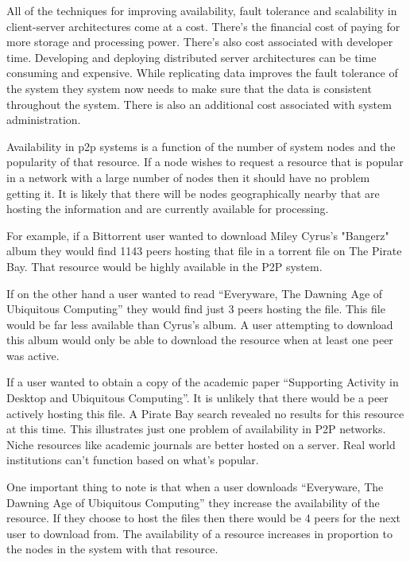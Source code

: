 \documentclass[11pt]{amsart}
\begin{document}
\indent All of the techniques for improving availability, fault tolerance and scalability in client-server architectures come at a cost. There's the financial cost of paying for more storage and processing power. There's also cost associated with developer time. Developing and deploying distributed server architectures can be time consuming and expensive. While replicating data improves the fault tolerance of the system they system now needs to make sure that the data is consistent throughout the system. There is also an additional cost associated with system administration.\cite{DistSys}


\indent
Availability in p2p systems is a function of the number of system nodes and the popularity of that resource. If a node wishes to request a resource that is popular in a network with a large number of nodes then it should have no problem getting it. It is likely that there will be nodes geographically nearby that are hosting the information and are currently available for processing. 

\indent For example, if a Bittorrent user wanted to download Miley Cyrus's "Bangerz" album they would find 1143 peers hosting that file in a torrent file on The Pirate Bay. That resource would be highly available in the P2P system.\cite{Miley}

\indent If on the other hand a user wanted to read ``Everyware, The Dawning Age of Ubiquitous Computing'' they would find just 3 peers hosting the file. This file would be far less available than Cyrus's album. A user attempting to download this album would only be able to download the resource when at least one peer was active.\cite{Everyware}

\indent If a user wanted to obtain a copy of the academic paper ``Supporting Activity in Desktop and Ubiquitous Computing''. It is unlikely that there would be a peer actively hosting this file. A Pirate Bay search revealed no results for this resource at this time.
This illustrates just one problem of availability in P2P networks. Niche resources like academic journals are better hosted on a server. Real world institutions can't function based on what's popular. 

\indent One important thing to note is that when a user downloads ``Everyware, The Dawning Age of Ubiquitous Computing'' they increase the availability of the resource. If they choose to host the files then there would be 4 peers for the next user to download from. The availability of a resource increases in proportion to the nodes in the system with that resource.
\end{document}
